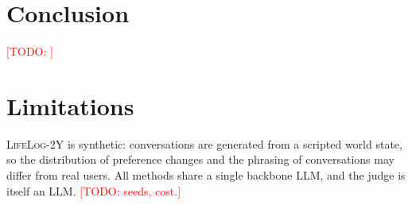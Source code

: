 \documentclass[11pt]{article}
\newcommand{\dataset}{\textsc{LifeLog-2Y}}
\newcommand{\todo}[1]{\textcolor{red}{[TODO: #1]}}
\begin{document}
\section{Conclusion}

\todo{}

\section*{Limitations}

\dataset{} is synthetic: conversations are generated from a scripted world state, so the distribution of preference changes and the phrasing of conversations may differ from real users. All methods share a single backbone LLM, and the judge is itself an LLM. \todo{seeds, cost.}


\end{document}
